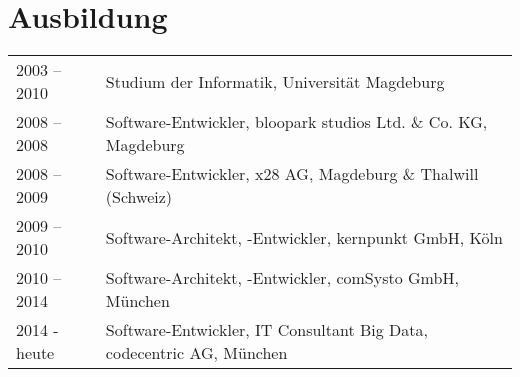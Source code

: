 \section*{Ausbildung}
\begin{longtable}{@{}p{6cm}p{10cm}}
2003 – 2010 	& Studium der Informatik, Universität Magdeburg\\
2008 – 2008 	& Software-Entwickler, bloopark studios Ltd. \& Co. KG, Magdeburg\\
2008 – 2009 	& Software-Entwickler, x28 AG, Magdeburg \&  Thalwill (Schweiz)\\
2009 – 2010  	& Software-Architekt, -Entwickler, kernpunkt GmbH, Köln\\
2010 – 2014  	& Software-Architekt, -Entwickler, comSysto GmbH, München\\
2014 - heute	& Software-Entwickler, IT Consultant Big Data, codecentric AG, München
\end{longtable}

